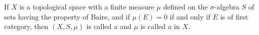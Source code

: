 If $X$ is a topological space with a finite measure $\mu$ defined on the $\sigma$-algebra $S$ of sets having the property of Baire, and if $\mu(E) = 0$ if and only if $E$ is of first category, then $(X, S, \mu)$ is called a  and $\mu$ is called a  in $X$.
